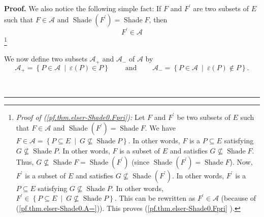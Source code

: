 \documentclass[numbers=enddot,12pt,final,onecolumn]{scrartcl}%
\theoremstyle{definition}
\newenvironment{proof}[1][Proof]{\noindent\textbf{#1.} }{\ \rule{0.5em}{0.5em}}
\newenvironment{verlong}{}{}
\begin{document}
\begin{verlong}
\begin{proof}
We also notice the following simple fact: If $F$ and $F^{\prime}$ are two
subsets of $E$ such that $F\in\mathcal{A}$ and $\operatorname*{Shade}\left(
F^{\prime}\right)  =\operatorname*{Shade}F$, then%
\begin{equation}
F^{\prime}\in\mathcal{A} \label{pf.thm.elser-Shade0.Fpri}%
\end{equation}
\footnote{\textit{Proof of (\ref{pf.thm.elser-Shade0.Fpri}):} Let $F$ and
$F^{\prime}$ be two subsets of $E$ such that $F\in\mathcal{A}$ and
$\operatorname*{Shade}\left(  F^{\prime}\right)  =\operatorname*{Shade}F$. We
have $F\in\mathcal{A}=\left\{  P\subseteq E\ \mid\ G\not \subseteq
\operatorname*{Shade}P\right\}  $. In other words, $F$ is a $P\subseteq E$
satisfying $G\not \subseteq \operatorname*{Shade}P$. In other words, $F$ is a
subset of $E$ and satisfies $G\not \subseteq \operatorname*{Shade}F$. Thus,
$G\not \subseteq \operatorname*{Shade}F=\operatorname*{Shade}\left(
F^{\prime}\right)  $ (since $\operatorname*{Shade}\left(  F^{\prime}\right)
=\operatorname*{Shade}F$). Now, $F^{\prime}$ is a subset of $E$ and satisfies
$G\not \subseteq \operatorname*{Shade}\left(  F^{\prime}\right)  $. In other
words, $F^{\prime}$ is a $P\subseteq E$ satisfying $G\not \subseteq
\operatorname*{Shade}P$. In other words, $F^{\prime}\in\left\{  P\subseteq
E\ \mid\ G\not \subseteq \operatorname*{Shade}P\right\}  $. This can be
rewritten as $F^{\prime}\in\mathcal{A}$ (because of
(\ref{pf.thm.elser-Shade0.A=})). This proves (\ref{pf.thm.elser-Shade0.Fpri}%
).}

We now define two subsets $\mathcal{A}_{+}$ and $\mathcal{A}_{-}$ of
$\mathcal{A}$ by%
\[
\mathcal{A}_{+}=\left\{  P\in\mathcal{A}\ \mid\ \varepsilon\left(  P\right)
\in P\right\}  \ \ \ \ \ \ \ \ \ \ \text{and}\ \ \ \ \ \ \ \ \ \ \mathcal{A}%
_{-}=\left\{  P\in\mathcal{A}\ \mid\ \varepsilon\left(  P\right)  \notin
P\right\}  .
\]



\end{proof}
\end{verlong}
\end{document}
